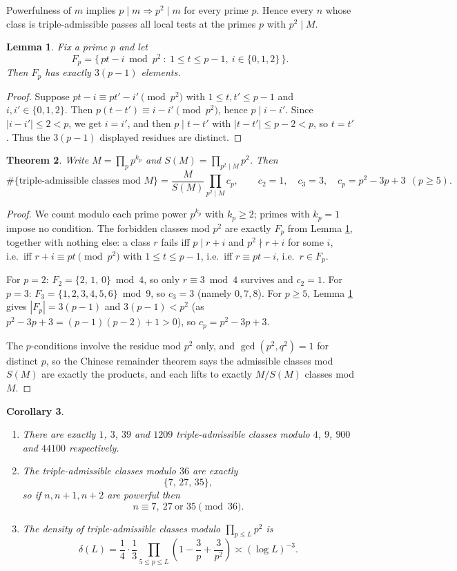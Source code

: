 \documentclass[11pt]{article}
\newtheorem{theorem}{Theorem}[section]
\newtheorem{lemma}[theorem]{Lemma}
\newtheorem{corollary}[theorem]{Corollary}
\theoremstyle{definition}
\begin{document}
Powerfulness of $m$ implies $p\mid m \Rightarrow p^2\mid m$ for every prime $p$.
Hence every $n$ whose class is triple-admissible passes all local tests at the
primes $p$ with $p^2\mid M$.

\begin{lemma}\label{lem:crt}
Fix a prime $p$ and let
\[ F_p=\bigl\{\,pt-i \bmod p^2\ :\ 1\le t\le p-1,\ i\in\{0,1,2\}\,\bigr\}.\]
Then $F_p$ has exactly $3(p-1)$ elements.
\end{lemma}

\begin{proof}
Suppose $pt-i\equiv pt'-i'\pmod{p^2}$ with $1\le t,t'\le p-1$ and
$i,i'\in\{0,1,2\}$. Then $p(t-t')\equiv i-i'\pmod{p^2}$, hence $p\mid i-i'$. Since
$|i-i'|\le2<p$, we get $i=i'$, and then $p\mid t-t'$ with
$|t-t'|\le p-2<p$, so $t=t'$. Thus the $3(p-1)$ displayed residues are distinct.
\end{proof}

\begin{theorem}\label{thm:local}
Write $M=\prod_{p} p^{k_p}$ and $S(M)=\prod_{p^2\mid M} p^2$. Then
\[
\#\{\text{triple-admissible classes mod }M\}
=\frac{M}{S(M)}\prod_{p^2\mid M} c_p,
\qquad
c_2=1,\quad c_3=3,\quad c_p=p^2-3p+3\ \ (p\ge5).
\]
\end{theorem}

\begin{proof}
We count modulo each prime power $p^{k_p}$ with $k_p\ge2$; primes with $k_p=1$
impose no condition. The forbidden classes mod $p^2$ are exactly $F_p$ from
Lemma \ref{lem:crt}, together with nothing else: a class $r$ fails iff
$p\mid r+i$ and $p^2\nmid r+i$ for some $i$, i.e.\ iff $r+i\equiv pt\pmod{p^2}$
with $1\le t\le p-1$, i.e.\ iff $r\equiv pt-i$, i.e.\ $r\in F_p$.

For $p=2$: $F_2=\{2,\,1,\,0\}\bmod 4$, so only $r\equiv3\bmod4$ survives and
$c_2=1$. For $p=3$: $F_3=\{1,2,3,4,5,6\}\bmod9$, so $c_3=3$ (namely $0,7,8$).
For $p\ge5$, Lemma \ref{lem:crt} gives $|F_p|=3(p-1)$ and
$3(p-1)<p^2$ (as $p^2-3p+3=(p-1)(p-2)+1>0$), so $c_p=p^2-3p+3$.

The $p$-conditions involve the residue mod $p^2$ only, and $\gcd(p^2,q^2)=1$ for
distinct $p$, so the Chinese remainder theorem says the admissible classes mod
$S(M)$ are exactly the products, and each lifts to exactly $M/S(M)$ classes mod $M$.
\end{proof}

\begin{corollary}\label{cor:counts}
\begin{enumerate}[leftmargin=2em]
\item There are exactly $1$, $3$, $39$ and $1209$ triple-admissible classes modulo
$4$, $9$, $900$ and $44100$ respectively.
\item The triple-admissible classes modulo $36$ are exactly
\[\{7,\,27,\,35\},\]
so if $n,n+1,n+2$ are powerful then
\[n\equiv 7,\ 27\ \text{or } 35 \pmod{36}.\]
\item The density of triple-admissible classes modulo $\prod_{p\le L}p^2$ is
\[\delta(L)=\frac14\cdot\frac13\prod_{5\le p\le L}\left(1-\frac{3}{p}+\frac{3}{p^2}\right)\asymp(\log L)^{-3}.\]
\end{enumerate}
\end{corollary}
\end{document}
